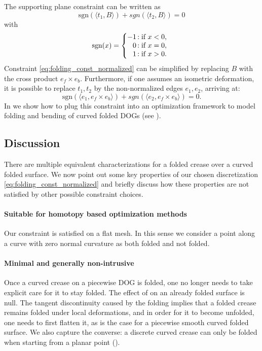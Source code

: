 The supporting plane constraint can be written as
\begin{equation} \label{eq:folding_const_normalized} 
\text{sgn}(\langle t_1,B\rangle) +  {sgn}(\langle t_2,B\rangle) = 0
\end{equation}
with 
\begin{equation} \label{eq:sign}
\text{sgn}(x) = \left\{
     \begin{array}{@{}r@{\thinspace}l}
       -1  &: \text{if } x < 0, \\
       0 &: \text{if } x = 0, \\
       1 &: \text{if } x > 0. \\
     \end{array}
   \right.
\end{equation}
%
Constraint \eqref{eq:folding_const_normalized} can be simplified by replacing $B$ with the cross product $e_f \times e_b$. Furthermore, if one assumes an isometric deformation, it is possible to replace $t_1,t_2$ by the non-normalized edges $e_1,e_2$, arriving at:
\begin{equation} \label{eq:folding_const}
\text{sgn}(\langle e_1,e_f \times e_b \rangle) +  {sgn}(\langle e_2,e_f \times e_b\rangle) = 0.
\end{equation}
In  we show how to plug this constraint into an optimization framework to model folding and bending of curved folded DOGs (see ).

\subsection{Discussion}
There are multiple equivalent characterizations for a folded crease over a curved folded surface. We now point out some key properties of our chosen discretization \eqref{eq:folding_const_normalized} and briefly discuss how these properties are not satisfied by other possible constraint choices.

\paragraph{Suitable for homotopy based optimization methods} 
Our constraint is satisfied on a flat mesh. In this sense we consider a point along a curve with zero normal curvature as both folded and not folded.
 
\paragraph{Minimal and generally non-intrusive} 
Once a curved crease on a piecewise DOG is folded, one no longer needs to take explicit care for it to stay folded. The effect of  on an already folded surface is null. The tangent discontinuity caused by the folding implies that a folded crease remains folded under local deformations, and in order for it to become unfolded, one needs to first flatten it, as is the case for a piecewise smooth curved folded surface. We also capture the converse: a discrete curved crease can only be folded when starting from a planar point (). \\


